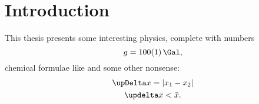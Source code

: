 \chapter{Introduction}\label{ch:introduction}
This thesis presents some interesting physics, complete with numbers
\begin{equation}
   g = \SI{100+-1}{\Gal}\text{,}
\end{equation}
chemical formulae like  and some other nonsense:
\begin{gather}
   \Del{x} = \abs{x_1 - x_2}\\
   \del{x} < \mean{x}\text{.}
\end{gather}